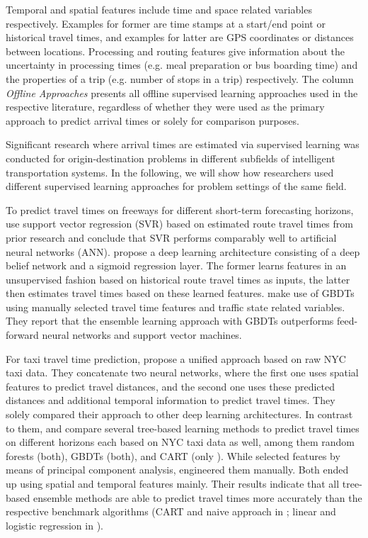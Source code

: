 Temporal and spatial features include time and space related variables respectively. Examples for former are time stamps at a start/end point or historical travel times, and examples for latter are GPS coordinates or distances between locations. Processing and routing features give information about the uncertainty in processing times (e.g. meal preparation or bus boarding time) and the properties of a trip (e.g. number of stops in a trip) respectively. 
The column \textit{Offline Approaches} presents all offline supervised learning approaches used in the respective literature, regardless of whether they were used as the primary approach to predict arrival times or solely for comparison purposes.

Significant research where arrival times are estimated via supervised learning was conducted for origin-destination problems in different subfields of intelligent transportation systems. In the following, we will show how researchers used different supervised learning approaches for problem settings of the same field. 

To predict travel times on freeways for different short-term forecasting horizons, \citet{Vanajakshi2007} use support vector regression (SVR) based on estimated route travel times from prior research and conclude that SVR performs comparably well to artificial neural networks (ANN).
\citet{Siripanpornchana2016_AnnWithDbnFS} propose a deep learning architecture consisting of a deep belief network and a sigmoid regression layer. The former learns features in an unsupervised fashion based on historical route travel times as inputs, the latter then estimates travel times based on these learned features. \citet{Cheng2019_GBDT} make use of GBDTs using manually selected travel time features and traffic state related variables. They report that the ensemble learning approach with GBDTs outperforms feed-forward
neural networks and support vector machines.

For taxi travel time prediction, \citet{jindal2017unified} propose a unified approach based on raw NYC taxi data. They concatenate two neural networks, where the first one uses spatial features to predict travel distances, and the second one uses these predicted distances and additional temporal information to predict travel times. They solely compared their approach to other deep learning architectures.
In contrast to them, \citet{Huang2018_GBDT} and \citet{huang2020travel_GBDT} compare several tree-based learning methods to predict travel times on different horizons each based on NYC taxi data as well, among them random forests (both), GBDTs (both), and CART (only \citet{huang2020travel_GBDT}). While \citet{Huang2018_GBDT} selected features by means of principal component analysis, \citet{huang2020travel_GBDT} engineered them manually. Both ended up using spatial and temporal features mainly. Their results indicate that all tree-based ensemble methods are able to predict travel times more accurately than the respective benchmark algorithms (CART and naive approach in \citet{huang2020travel_GBDT}; linear and logistic regression in \citet{Huang2018_GBDT}).

